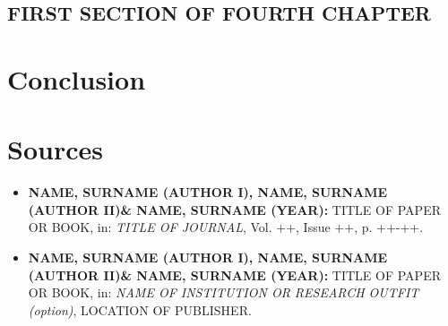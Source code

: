 \documentclass[11pt,a4paper,english]{scrreprt}
\begin{document}
  \section{FIRST SECTION OF FOURTH CHAPTER}


  
  
\chapter{Conclusion}







\chapter{Sources}

  \begin{itemize}
	
	\sffamily
	

	\item [\Rectsteel] \textbf{NAME, SURNAME (AUTHOR I), NAME, SURNAME
(AUTHOR II)\& NAME, SURNAME (YEAR):} TITLE OF PAPER OR BOOK,
in: \textsl{TITLE OF JOURNAL}, Vol. ++, Issue ++, p. ++-++.


	\item [\Rectsteel] \textbf{NAME, SURNAME (AUTHOR I), NAME, SURNAME
(AUTHOR II)\& NAME, SURNAME (YEAR):} TITLE OF PAPER OR BOOK,
in: \textsl{NAME OF INSTITUTION OR RESEARCH OUTFIT (option)}, LOCATION OF
PUBLISHER.


  \end{itemize}
\end{document}
